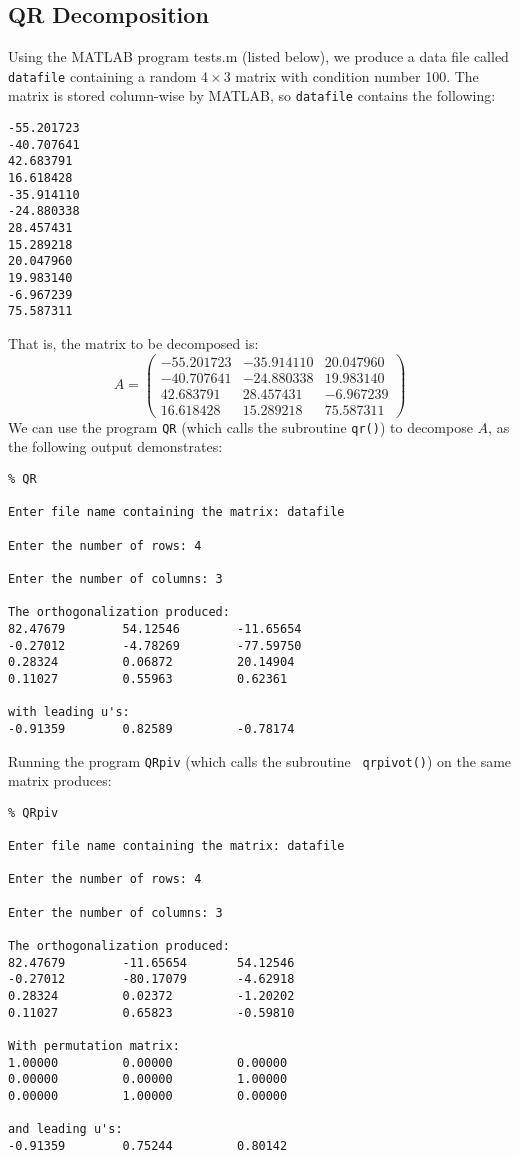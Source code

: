\documentclass{article}
\begin{document}
\subsection{QR Decomposition}
Using the MATLAB program tests.m (listed below), we produce 
a data file called {\tt datafile} containing a random $4 \times 3$
matrix with condition number 100.  The matrix is stored column-wise by
MATLAB, so {\tt datafile} contains the following:
\begin{verbatim}
-55.201723
-40.707641
42.683791
16.618428
-35.914110
-24.880338
28.457431
15.289218
20.047960
19.983140
-6.967239
75.587311
\end{verbatim}
That is, the matrix to be decomposed is:
\[A = \left(\begin{array}{ccc}
-55.201723 & -35.914110  &20.047960\\
-40.707641& -24.880338 & 19.983140\\
42.683791 & 28.457431& -6.967239\\
16.618428 &15.289218 & 75.587311 \end{array} \right) \]
We can use the program {\tt QR} (which calls the subroutine {\tt qr()})
to decompose $A$, as the following output demonstrates:
\begin{verbatim}
% QR
 
Enter file name containing the matrix: datafile
 
Enter the number of rows: 4
 
Enter the number of columns: 3
 
The orthogonalization produced: 
82.47679        54.12546        -11.65654 
-0.27012        -4.78269        -77.59750 
0.28324         0.06872         20.14904 
0.11027         0.55963         0.62361 
 
with leading u's:
-0.91359        0.82589         -0.78174 

\end{verbatim}
Running the program {\tt QRpiv} (which calls the subroutine {\tt
  qrpivot()}) on the same matrix produces:
\begin{verbatim}
% QRpiv
 
Enter file name containing the matrix: datafile
 
Enter the number of rows: 4
 
Enter the number of columns: 3
 
The orthogonalization produced: 
82.47679        -11.65654       54.12546 
-0.27012        -80.17079       -4.62918 
0.28324         0.02372         -1.20202 
0.11027         0.65823         -0.59810 
 
With permutation matrix: 
1.00000         0.00000         0.00000 
0.00000         0.00000         1.00000 
0.00000         1.00000         0.00000 
 
and leading u's:
-0.91359        0.75244         0.80142 
\end{verbatim}
\end{document}
